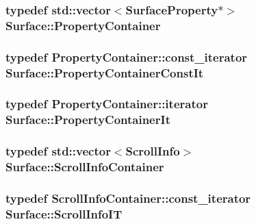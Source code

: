 \subsubsection[{\texorpdfstring{Property\+Container}{PropertyContainer}}]{\setlength{\rightskip}{0pt plus 5cm}typedef std\+::vector$<${\bf Surface\+Property}$\ast$$>$ {\bf Surface\+::\+Property\+Container}}\hypertarget{classSurface_a7890ba0bba332887c7511468f10a8e85}{}\label{classSurface_a7890ba0bba332887c7511468f10a8e85}
\subsubsection[{\texorpdfstring{Property\+Container\+Const\+It}{PropertyContainerConstIt}}]{\setlength{\rightskip}{0pt plus 5cm}typedef Property\+Container\+::const\+\_\+iterator {\bf Surface\+::\+Property\+Container\+Const\+It}}\hypertarget{classSurface_ab30c0b6e5e6119d88e09c50c71632819}{}\label{classSurface_ab30c0b6e5e6119d88e09c50c71632819}
\subsubsection[{\texorpdfstring{Property\+Container\+It}{PropertyContainerIt}}]{\setlength{\rightskip}{0pt plus 5cm}typedef Property\+Container\+::iterator {\bf Surface\+::\+Property\+Container\+It}}\hypertarget{classSurface_a828990970629ddd1207584544daaca7f}{}\label{classSurface_a828990970629ddd1207584544daaca7f}
\subsubsection[{\texorpdfstring{Scroll\+Info\+Container}{ScrollInfoContainer}}]{\setlength{\rightskip}{0pt plus 5cm}typedef std\+::vector$<${\bf Scroll\+Info}$>$ {\bf Surface\+::\+Scroll\+Info\+Container}}\hypertarget{classSurface_a7b781fa8ee9f22afe59f5aa871fd7b6e}{}\label{classSurface_a7b781fa8ee9f22afe59f5aa871fd7b6e}
\subsubsection[{\texorpdfstring{Scroll\+Info\+IT}{ScrollInfoIT}}]{\setlength{\rightskip}{0pt plus 5cm}typedef Scroll\+Info\+Container\+::const\+\_\+iterator {\bf Surface\+::\+Scroll\+Info\+IT}}\hypertarget{classSurface_a603071753114924b36bdba9241010984}{}\label{classSurface_a603071753114924b36bdba9241010984}


